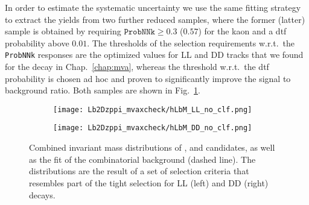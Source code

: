 In order to estimate the systematic uncertainty we use the same fitting strategy to extract the yields from two further reduced samples, where the former (latter) sample is obtained by requiring $\texttt{ProbNNk} \ge 0.3$ ($0.57$) for the kaon and a \gls{dtf} probability above $0.01$.
The thresholds of the selection requirements w.r.t.\ the \texttt{ProbNNk} responses are the optimized values for \gls{LL} and \gls{DD} tracks that we found for the \decay{\Lb}{\Dz\Lz} decay in Chap.~\ref{chap:mva}, whereas the threshold w.r.t.\ the \gls{dtf} probability is chosen ad hoc and proven to significantly improve the signal to background ratio.
Both samples are shown in Fig.~\ref{fig:LbToDzppi_hLbM_no_clf}.
\begin{figure}[htbp]
    \centering
    \begin{subfigure}{.49\textwidth}
        \centering
        \texttt{[image: Lb2Dzppi\_mvaxcheck/hLbM\_LL\_no\_clf.png]}
    \end{subfigure}
    \begin{subfigure}{.49\textwidth}
        \centering
        \texttt{[image: Lb2Dzppi\_mvaxcheck/hLbM\_DD\_no\_clf.png]}
    \end{subfigure}
    \caption{Combined invariant mass distributions of \Dz, \proton and \pim candidates, as well as the fit of the combinatorial background (dashed line). The distributions are the result of a set of selection criteria that resembles part of the tight selection for \gls{LL} (left) and \gls{DD} (right) \decay{\Lb}{\Dz\Lz} decays.}
    \label{fig:LbToDzppi_hLbM_no_clf}
\end{figure}

